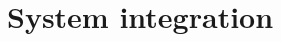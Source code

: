 \documentclass[a4paper, notitlepage]{report}
\begin{document}
\chapter{System integration}

\end{document}
